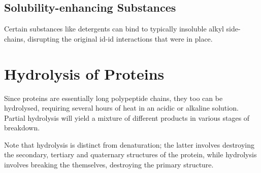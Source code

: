 

		\subsection{Solubility-enhancing Substances}

			Certain substances like detergents can bind to typically insoluble alkyl side-chains, disrupting the original id-id interactions that
			were in place.





	\section{Hydrolysis of Proteins}

		Since proteins are essentially long polypeptide chains, they too can be hydrolysed, requiring several hours of heat in an acidic or
		alkaline solution. Partial hydrolysis will yield a mixture of different products in various stages of breakdown.

		Note that hydrolysis is distinct from denaturation; the latter involves destroying the secondary, tertiary and quaternary structures
		of the protein, while hydrolysis involves breaking the  themselves, destroying the primary structure.



